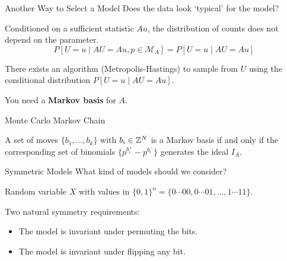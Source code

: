 \documentclass[xcolor=dvipsnames]{beamer}
\newcommand*{\as}{A}
\newcommand*{\ms}{\mathcal M}
\begin{document}
\begin{frame}{Another Way to Select a Model}
    Does the data look `typical' for the model?

    \lspace

    \begin{theorem}
        Conditioned on a sufficient statistic $\as u$, the distribution of
        counts does not depend on the parameter.
        \[
            P[U = u \mid \as U = \as u, p \in \ms_\as]
            =
            P[U = u \mid \as U = \as u]
        \]
    \end{theorem}

    There exists an algorithm (Metropolis-Hastings) to sample from $U$ using
    the conditional distribution $P[U = u \mid AU = Au]$.

    \lspace
    You need a \textbf{Markov basis} for $A$.
\end{frame}

\begin{frame}{Monte Carlo Markov Chain}
    \begin{theorem}
        A set of moves $\{b_1, \ldots, b_k\}$ with $b_i \in \mathbb{Z}^N$ is a Markov basis
        if and only if the corresponding set of binomials $\{p^{b_i^+} -
        p^{b_i^-}\}$ generates the ideal $I_A$.
    \end{theorem}
\end{frame}

\begin{frame}{Symmetric Models}
    What kind of models should we consider?

    \lspace
    Random variable $X$ with values in $\{0, 1\}^n = \{0\cdots00, 0\cdots01,
    \ldots, 1\cdots11\}$.

    \lspace
    Two natural symmetry requirements:
    \begin{itemize}
    \item The model is invariant under permuting the bits.
    \item The model is invariant under flipping any bit.
    \end{itemize}
\end{frame}
\end{document}
